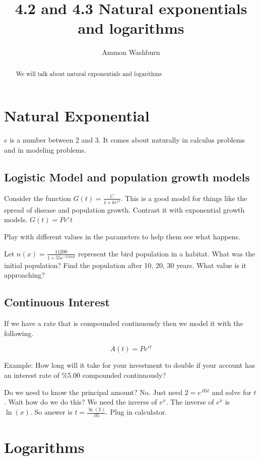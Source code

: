 \documentclass{tufte-handout}
\title{4.2 and 4.3 Natural exponentials and logarithms}
\author[AW]{Ammon Washburn}
\begin{document}
\maketitle

\begin{abstract}
We will talk about natural exponentials and logarithms
\end{abstract}

\section{Natural Exponential}
$e$ is a number between 2 and 3.  It comes about naturally in calculus problems and in modeling problems.

\subsection{Logistic Model and population growth models}

Consider the function $G(t) = \frac{C}{1+ke^{rt}}$.  This is a good model for things like the spread of disease and population growth.  Contrast it with exponential growth models. $G(t) = P e^rt$

Play with different values in the parameters to help them see what happens.

Let $n(x) = \frac{11200}{1+55e^{-0.044t}}$ represent the bird population in a habitat.  What was the initial population? Find the population after 10, 20, 30 years.  What value is it approaching?

\subsection{Continuous Interest}
If we have a rate that is compounded continuously then we model it with the following.

\[
A(t) = Pe^{rt}
\]

Example: How long will it take for your investment to double if your account has an interest rate of \%5.00 compounded continuously?

Do we need to know the principal amount?  No.  Just need $2=e^{.05t}$ and solve for $t$.  Wait how do we do this? We need the inverse of $e^x$.  The inverse of $e^x$ is $\ln(x)$.  So answer is $t = \frac{\ln (2)}{.05}$.  Plug in calculator.

\section{Logarithms}
\end{document}
